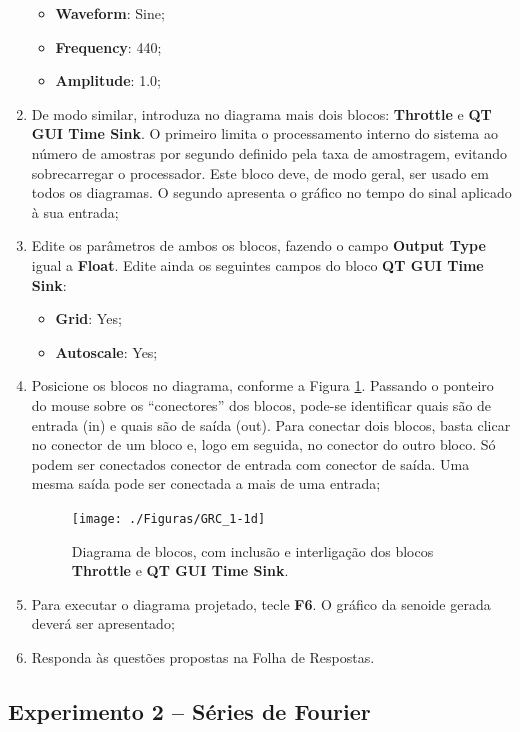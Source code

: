 \documentclass[12pt,addpoints]{exam}
\begin{document}
\begin{enumerate}
\begin{itemize}
        \item \textbf{Waveform}: Sine;
        \item \textbf{Frequency}: 440;
        \item \textbf{Amplitude}: 1.0;
    \end{itemize}
    \item De modo similar, introduza no diagrama mais dois blocos: \textbf{Throttle} e \textbf{QT GUI Time Sink}. O primeiro limita o processamento interno do sistema ao número de amostras por segundo definido pela taxa de amostragem, evitando sobrecarregar o processador. Este bloco deve, de modo geral, ser usado em todos os diagramas. O segundo apresenta o gráfico no tempo do sinal aplicado à sua entrada;
    \item Edite os parâmetros de ambos os blocos, fazendo o campo \textbf{Output Type} igual a \textbf{Float}. Edite ainda os seguintes campos do bloco \textbf{QT GUI Time Sink}:
    \begin{itemize}
        \item \textbf{Grid}: Yes;
        \item \textbf{Autoscale}: Yes;
    \end{itemize}
    \item Posicione os blocos no diagrama, conforme a Figura \ref{fig:GRC_1-1d}. Passando o ponteiro do mouse sobre os ``conectores'' dos blocos, pode-se identificar quais são de entrada (in) e quais são de saída (out). Para conectar dois blocos, basta clicar no conector de um bloco e, logo em seguida, no conector do outro bloco. Só podem ser conectados conector de entrada com conector de saída. Uma mesma saída pode ser conectada a mais de uma entrada;
    \begin{figure}[htb]
        \centering
        \texttt{[image: ./Figuras/GRC\_1-1d]} \\
        \caption{Diagrama de blocos, com inclusão e interligação dos blocos \textbf{Throttle} e \textbf{QT GUI Time Sink}.} 
        \label{fig:GRC_1-1d}
    \end{figure}
    \item Para executar o diagrama projetado, tecle \textbf{F6}. O gráfico da senoide gerada deverá ser apresentado;
    \item Responda às questões propostas na Folha de Respostas.
\end{enumerate}

\subsection{Experimento 2 -- Séries de Fourier}
\end{document}
